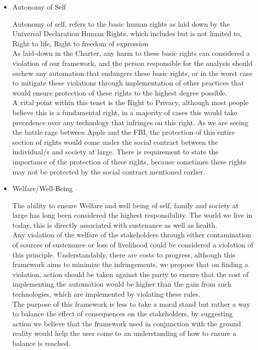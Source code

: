 \begin{itemize}
  \item Autonomy of Self
    \begin{pointenv}
      Autonomy of self, refers to the basic human rights as laid down by the Universal Declaration Human Rights\cite{assembly1948universal}, which includes but is not limited to, Right to life, Right to freedom of expression\\
      As laid-down in the Charter, any harm to these basic rights can considered a violation of our framework, and the person responsible for the analysis should eschew any automation that endangers these basic rights, or in the worst case to mitigate these violations through implementation of other practices that would ensure protection of these rights to the highest degree possible.\\
      A vital point within this tenet is the Right to Privacy, although most people believe this is a fundamental right, in a majority of  cases this would take precedence over any technology that infringes on this right. As we are seeing the battle rage between Apple and the FBI, the protection of this entire section of rights would come under the social contract between the individual/s and society at large. There is requirement to state the importance of the protection of these rights, because sometimes these rights may not be protected by the social contract mentioned earlier. 
    \end{pointenv}

  \item Welfare/Well-Being
    \begin{pointenv}
      The ability to ensure Welfare and well being of self, family and society at large has long been considered the highest responsibility. The world we live in today, this is directly associated with sustenance as well as health.\\
      Any violation of the welfare of the stakeholders through either contamination of sources of sustenance or loss of livelihood could be considered a violation of this principle. Understandably, there are costs to progress, although this framework aims to minimize the infringements, we propose that on finding a violation, action should be taken against the party to ensure that the cost of implementing the automation would be higher than the gain from such technologies, which are implemented by violating these rules.\\
      The purpose of this framework is less to take a moral stand but rather a way to balance the effect of consequences on the stakeholders, by suggesting action we believe that the framework used in conjunction with the ground reality would help the user come to an understanding of how to ensure a balance is reached. 
    \end{pointenv}


\end{itemize}
